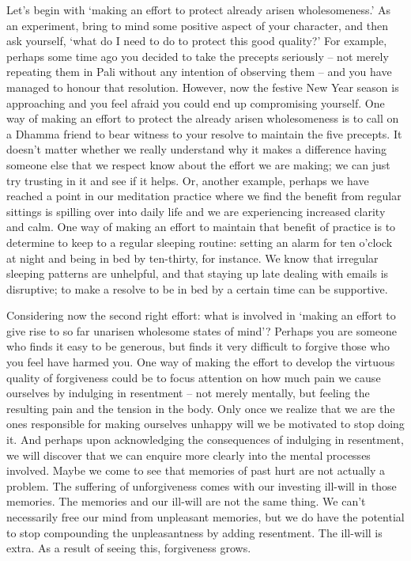 Let's begin with `making an effort to protect already arisen
wholesomeness.' As an experiment, bring to mind some positive aspect of
your character, and then ask yourself, `what do I need to do to protect
this good quality?' For example, perhaps some time ago you decided to
take the precepts seriously -- not merely repeating them in Pali without
any intention of observing them -- and you have managed to honour that
resolution. However, now the festive New Year season is approaching and
you feel afraid you could end up compromising yourself. One way of
making an effort to protect the already arisen wholesomeness is to call
on a Dhamma friend to bear witness to your resolve to maintain the five
precepts. It doesn't matter whether we really understand why it makes a
difference having someone else that we respect know about the effort we
are making; we can just try trusting in it and see if it helps. Or,
another example, perhaps we have reached a point in our meditation
practice where we find the benefit from regular sittings is spilling
over into daily life and we are experiencing increased clarity and calm.
One way of making an effort to maintain that benefit of practice is to
determine to keep to a regular sleeping routine: setting an alarm for
ten o'clock at night and being in bed by ten-thirty, for instance. We
know that irregular sleeping patterns are unhelpful, and that staying up
late dealing with emails is disruptive; to make a resolve to be in bed
by a certain time can be supportive.

Considering now the second right effort: what is involved in `making an
effort to give rise to so far unarisen wholesome states of mind'?
Perhaps you are someone who finds it easy to be generous, but finds it
very difficult to forgive those who you feel have harmed you. One way of
making the effort to develop the virtuous quality of forgiveness could
be to focus attention on how much pain we cause ourselves by indulging
in resentment -- not merely mentally, but feeling the resulting pain and
the tension in the body. Only once we realize that we are the ones
responsible for making ourselves unhappy will we be motivated to stop
doing it. And perhaps upon acknowledging the consequences of indulging
in resentment, we will discover that we can enquire more clearly into
the mental processes involved. Maybe we come to see that memories of
past hurt are not actually a problem. The suffering of unforgiveness
comes with our investing ill-will in those memories. The memories and
our ill-will are not the same thing. We can't necessarily free our mind
from unpleasant memories, but we do have the potential to stop
compounding the unpleasantness by adding resentment. The ill-will is
extra. As a result of seeing this, forgiveness grows.

